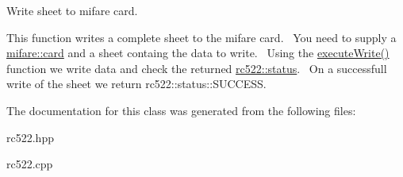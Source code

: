 Write sheet to mifare card. 

This function writes a complete sheet to the mifare card.~\newline
You need to supply a \hyperlink{classmifare_1_1card}{mifare\+::card} and a sheet containg the data to write.~\newline
Using the \hyperlink{classrc522_adab984cd49ca9affb679dded266c43f0}{execute\+Write()} function we write data and check the returned \hyperlink{classspiReader_a4bcf984823c38cf4841ebf619e788790}{rc522\+::status}.~\newline
On a successfull write of the sheet we return rc522\+::status\+::\+S\+U\+C\+C\+E\+SS. 

The documentation for this class was generated from the following files\+:\begin{DoxyCompactItemize}
\item 
rc522.\+hpp\item 
rc522.\+cpp\end{DoxyCompactItemize}
